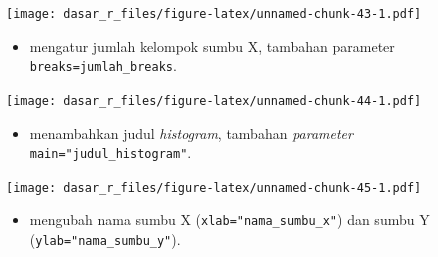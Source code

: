 \documentclass[
  12pt,
  a4paper,
]{scrbook}
\newenvironment{Shaded}{\begin{snugshade}}{\end{snugshade}}
\newcommand{\DataTypeTok}[1]{\textcolor[rgb]{0.13,0.29,0.53}{#1}}
\newcommand{\DecValTok}[1]{\textcolor[rgb]{0.00,0.00,0.81}{#1}}
\newcommand{\KeywordTok}[1]{\textcolor[rgb]{0.13,0.29,0.53}{\textbf{#1}}}
\newcommand{\NormalTok}[1]{#1}
\newcommand{\OperatorTok}[1]{\textcolor[rgb]{0.81,0.36,0.00}{\textbf{#1}}}
\newcommand{\StringTok}[1]{\textcolor[rgb]{0.31,0.60,0.02}{#1}}
\providecommand{\tightlist}{%
  \setlength{\itemsep}{0pt}\setlength{\parskip}{0pt}}
\begin{document}
\begin{Shaded}
\end{Shaded}

\texttt{[image: dasar\_r\_files/figure-latex/unnamed-chunk-43-1.pdf]}

\newpage

\begin{itemize}
\tightlist
\item
  mengatur jumlah kelompok sumbu X, tambahan parameter
  \texttt{breaks=jumlah\_breaks}.
\end{itemize}

\begin{Shaded}
\end{Shaded}

\texttt{[image: dasar\_r\_files/figure-latex/unnamed-chunk-44-1.pdf]}

\begin{itemize}
\tightlist
\item
  menambahkan judul \emph{histogram}, tambahan \emph{parameter}
  \texttt{main="judul\_histogram"}.
\end{itemize}

\begin{Shaded}
\end{Shaded}

\texttt{[image: dasar\_r\_files/figure-latex/unnamed-chunk-45-1.pdf]}

\newpage

\begin{itemize}
\tightlist
\item
  mengubah nama sumbu X (\texttt{xlab="nama\_sumbu\_x"}) dan sumbu Y
  (\texttt{ylab="nama\_sumbu\_y"}).
\end{itemize}
\end{document}
